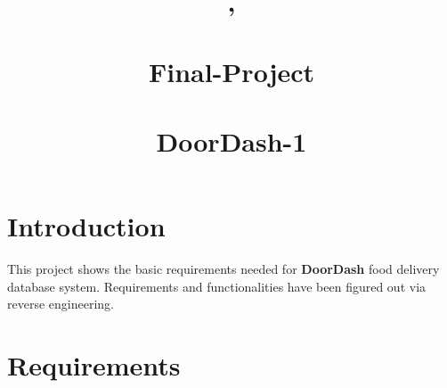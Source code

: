\documentclass[12pt,letterpaper]{article}
\title{\course, \semester \\ \textbf{\coursename} \\ \vspace{1cm} \Huge Final-Project \\ \GroupID \\ DoorDash-1}
\author{\NetIDa}
\date{}
\begin{document}
\begin{titlingpage}
\maketitle
\end{titlingpage}

\tableofcontents
\newpage
 
\section{Introduction}
This project shows the basic requirements needed for \textbf{DoorDash} food delivery database system. Requirements and functionalities have been figured out via reverse engineering.

\section{Requirements}
\end{document}

